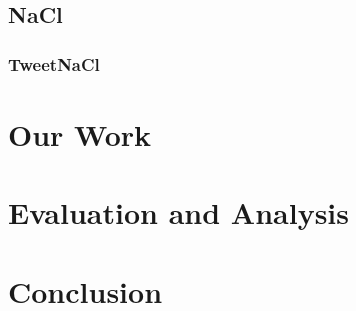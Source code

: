\documentclass[12pt]{article}
\begin{document}
\begin{multicols}{2}
\subsection{NaCl}
\subsubsection{TweetNaCl}
\section{Our Work}
\section{Evaluation and Analysis}
\section{Conclusion}
\end{multicols}
\end{document}
